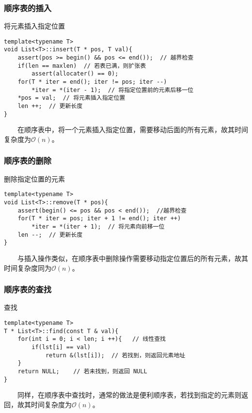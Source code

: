 \documentclass{beamer}
\begin{document}
	\begin{frame}[fragile]\frametitle{顺序表的插入}
		\begin{block}{将元素插入指定位置}
\begin{verbatim}
template<typename T>
void List<T>::insert(T * pos, T val){
    assert(pos >= begin() && pos <= end());  // 越界检查
    if(len == maxlen)  // 若表已满，则扩张表
        assert(allocater() == 0);
    for(T * iter = end(); iter != pos; iter --)
        *iter = *(iter - 1);  // 将指定位置前的元素后移一位
    *pos = val;  // 将元素插入指定位置
    len ++;  // 更新长度
}
\end{verbatim}
		\end{block}
		\ \ \ \ 在顺序表中，将一个元素插入指定位置，需要移动后面的所有元素，故其时间复杂度为$\mathcal{O}(n)$。
	\end{frame}

	\begin{frame}[fragile]\frametitle{顺序表的删除}
		\begin{block}{删除指定位置的元素}
\begin{verbatim}
template<typename T>
void List<T>::remove(T * pos){
    assert(begin() <= pos && pos < end());  //越界检查
    for(T * iter = pos; iter + 1 != end(); iter ++)
        *iter = *(iter + 1);  // 将元素向前移一位
    len --;  // 更新长度
}
\end{verbatim}
		\end{block}
	\ \ \ \ 与插入操作类似，在顺序表中删除操作需要移动指定位置后的所有元素，故其时间复杂度同为$\mathcal{O}(n)$。
	\end{frame}

	\begin{frame}[fragile]\frametitle{顺序表的查找}
		\begin{block}{查找}
\begin{verbatim}
template<typename T>
T * List<T>::find(const T & val){
    for(int i = 0; i < len; i ++){   // 线性查找
        if(lst[i] == val)
            return &(lst[i]);  // 若找到，则返回元素地址
    }
    return NULL;    // 若未找到，则返回 NULL
}
\end{verbatim}
		\end{block}
	\ \ \ \ 同样，在顺序表中查找时，通常的做法是便利顺序表，若找到指定的元素则返回，故其时间复杂度为$\mathcal{O}(n)$。
	\end{frame}
\end{document}
